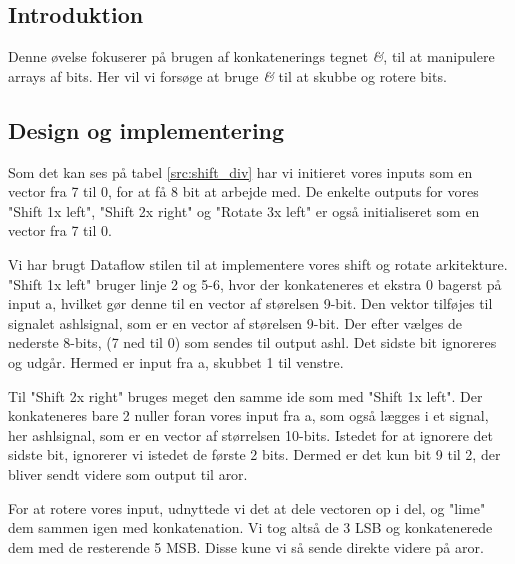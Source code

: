 \documentclass[../journal2.tex]{subfiles}
\begin{document}
\subsection{Introduktion}

Denne øvelse fokuserer på brugen af konkatenerings tegnet \textit{\&}, til at manipulere arrays af bits. Her vil vi forsøge at bruge \textit{\&} til at skubbe og rotere bits.

\subsection{Design og implementering}

Som det kan ses på tabel \ref{src:shift_div} har vi initieret vores inputs som en vector fra 7 til 0, for at få 8 bit at arbejde med. De enkelte outputs for vores "Shift 1x left", "Shift 2x right" og "Rotate 3x left" er også initialiseret som en vector fra 7 til 0.
\begin{table}[!h]
    \centering
      \framebox{
        \rule{8pt}{0pt}
          
  }
  \caption{Entity af shift\textunderscore div}
  \label{src:shift_div}
\end{table}

Vi har brugt Dataflow stilen til at implementere vores shift og rotate arkitekture. "Shift 1x left" bruger linje 2 og 5-6, hvor der konkateneres et ekstra 0 bagerst på input a, hvilket gør denne til en vector af størelsen 9-bit. Den vektor tilføjes til signalet a\textunderscore shl\textunderscore signal, som er en vector af størelsen 9-bit. Der efter vælges de nederste 8-bits, (7 ned til 0) som sendes til output a\textunderscore shl. Det sidste bit ignoreres og udgår. Hermed er input fra a, skubbet 1 til venstre.\par
Til "Shift 2x right" bruges meget den samme ide som med "Shift 1x left". Der konkateneres bare 2 nuller foran vores input fra a, som også lægges i et signal, her a\textunderscore shl\textunderscore signal, som er en vector af størrelsen 10-bits. Istedet for at ignorere det sidste bit, ignorerer vi istedet de første 2 bits. Dermed er det kun bit 9 til 2, der bliver sendt videre som output til a\textunderscore ror. \par
For at rotere vores input, udnyttede vi det at dele vectoren op i del, og "lime" dem sammen igen med konkatenation. Vi tog altså de 3 LSB og konkatenerede dem med de resterende 5 MSB. Disse kune vi så sende direkte videre på a\textunderscore ror.
\end{document}
